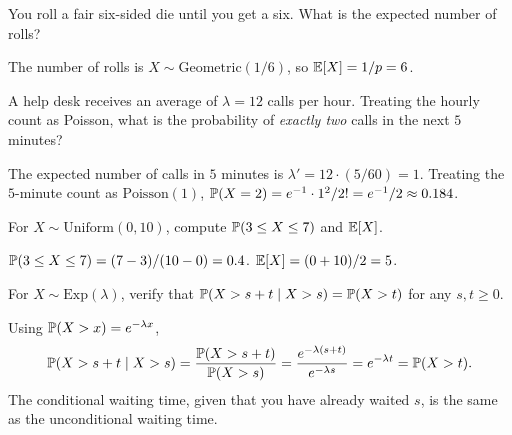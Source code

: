 \begin{warmup}[\coffee{1}]
You roll a fair six-sided die until you get a six. What is the expected number of rolls?
\end{warmup}
\begin{warmupSolution}
The number of rolls is $X \sim \mathrm{Geometric}(1/6)$, so $\mathbb{E}[X] = 1/p = 6$.
\end{warmupSolution}

\begin{warmup}[\coffee{2}]
A help desk receives an average of $\lambda = 12$ calls per hour. Treating the hourly count as Poisson, what is the probability of \emph{exactly two} calls in the next $5$ minutes?
\end{warmup}
\begin{warmupSolution}
The expected number of calls in $5$ minutes is $\lambda' = 12 \cdot (5/60) = 1$. Treating the $5$-minute count as $\mathrm{Poisson}(1)$, $\mathbb{P}(X = 2) = e^{-1} \cdot 1^2 / 2! = e^{-1}/2 \approx 0.184$.
\end{warmupSolution}

\begin{warmup}[\coffee{1}]
For $X \sim \mathrm{Uniform}(0, 10)$, compute $\mathbb{P}(3 \le X \le 7)$ and $\mathbb{E}[X]$.
\end{warmup}
\begin{warmupSolution}
$\mathbb{P}(3 \le X \le 7) = (7 - 3)/(10 - 0) = 0.4$. $\mathbb{E}[X] = (0 + 10)/2 = 5$.
\end{warmupSolution}

\begin{warmup}[\coffee{2}]
For $X \sim \mathrm{Exp}(\lambda)$, verify that $\mathbb{P}(X > s + t \mid X > s) = \mathbb{P}(X > t)$ for any $s, t \ge 0$.
\end{warmup}
\begin{warmupSolution}
Using $\mathbb{P}(X > x) = e^{-\lambda x}$,
\[
\mathbb{P}(X > s + t \mid X > s) = \frac{\mathbb{P}(X > s + t)}{\mathbb{P}(X > s)} = \frac{e^{-\lambda(s+t)}}{e^{-\lambda s}} = e^{-\lambda t} = \mathbb{P}(X > t).
\]
The conditional waiting time, given that you have already waited $s$, is the same as the unconditional waiting time.
\end{warmupSolution}

